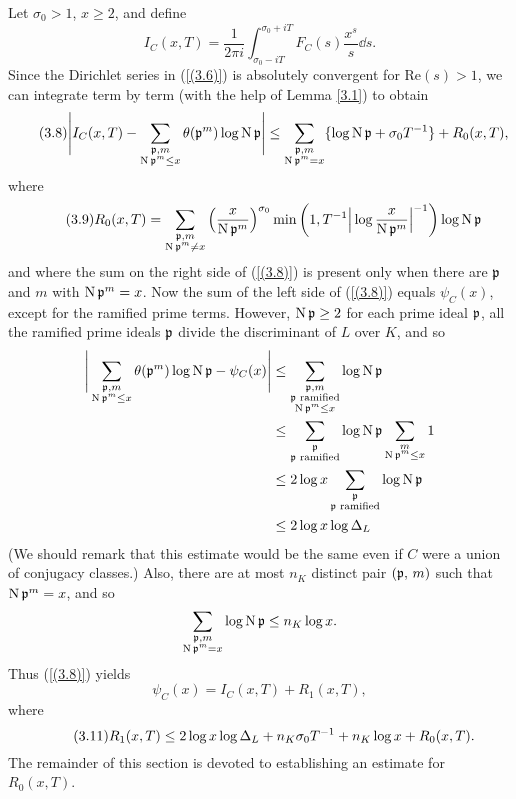 \documentclass[./main]{subfiles}
\begin{document}
Let $\sigma_0>1$, $x\ge 2$, and define
\[ \tag{3.7}\label{(3.7)}
I_C(x,T)= \frac{1}{2 \pi i} \int_{\sigma_0-iT}^{\sigma_0+iT} F_C(s)\frac{x^s}{s}\dd s.\]
Since the Dirichlet series in (\ref{(3.6)}) is absolutely convergent for $\text{Re}(s)>1$, we can integrate term by term (with the help of Lemma \ref{3.1}) to obtain
\[ \tag{3.8}\label{(3.8)}
\Bigg| I_C(x,T)-\sum_{\substack{\mathfrak{p}, m \\ \operatorname{N}\mathfrak{p}^m \le x}} \theta(\mathfrak{p}^m)\log \operatorname{N}\mathfrak{p} \Bigg| \le \sum_{\substack{\mathfrak{p}, m \\ \operatorname{N}\mathfrak{p}^m=x}}\{\log \operatorname{N}\mathfrak{p}+ \sigma_0T^{-1}\} +R_0(x,T),\]
where \[ \tag{3.9}\label{(3.9)}
R_0(x,T)=\sum_{\substack{\mathfrak{p}, m \\ \operatorname{N}\mathfrak{p}^m\neq x}}\Big( \frac{x}{\operatorname{N}\mathfrak{p}^m}\Big)^{\sigma_0} \min\bigg(1, T^{-1}\Big| \log \frac{x}{\operatorname{N}\mathfrak{p}^m}\Big|^{-1}\bigg) \log \operatorname{N} \mathfrak{p}\]
and where the sum on the right side of (\ref{(3.8)}) is present only when there are $\mathfrak{p}$ and $m$ with $\operatorname{N}\mathfrak{p}^m=x$. Now the sum of the left side of (\ref{(3.8)}) equals $\psi_C(x)$, except for the ramified prime terms. However, $\operatorname{N}\mathfrak{p} \ge 2$ for each prime ideal $\mathfrak{p}$, all the ramified prime ideals $\mathfrak{p}$ divide the discriminant of $L$ over $K$, and so 
\[\begin{aligned}
    \Bigg|\sum_{\substack{\mathfrak{p}, m \\ \operatorname{N}\mathfrak{p}^m \le x}} \theta(\mathfrak{p}^m)\log \operatorname{N}\mathfrak{p} -\psi_C(x)\Bigg| &\le \sum_{\substack{\mathfrak{p}, m \\ \mathfrak{p} \text{ ramified} \\ \operatorname{N}\mathfrak{p}^m \le x}} \log \operatorname{N}\mathfrak{p} 
    \\
    & \le \sum_{\substack{\mathfrak{p} \\ \mathfrak{p} \text{ ramified} }} \log \operatorname{N} \mathfrak{p} \sum_{\substack{m\\ \operatorname{N}\mathfrak{p}^m\le x}} 1 \\
    & \le 2 \log x \sum_{\substack{\mathfrak{p} \\ \mathfrak{p} \text{ ramified}}} \log \operatorname{N}\mathfrak{p} \\
    & \le 2 \log x \log \Delta_L
\end{aligned}\]
(We should remark that this estimate would be the same even if $C$ were a union of conjugacy classes.) Also, there are at most $n_K$ distinct pair $(\mathfrak{p}, \, m)$ such that $\operatorname{N}\mathfrak{p}^m=x$, and so
\[ \sum_{\substack{\mathfrak{p}, m \\ \operatorname{N}\mathfrak{p}^m=x}} \log \operatorname{N} \mathfrak{p} \le n_K\log x.\]
Thus (\ref{(3.8)}) yields
\[\tag{3.10} \label{(3.10)} \psi_C(x)=I_C(x,T)+R_1(x,T),\]
where
\[\tag{3.11} \label{(3.11)} R_1(x,T) \le 2 \log x \log \Delta_L+n_K\sigma_0T^{-1}+n_K \log x +R_0(x,T).\]
The remainder of this section is devoted to establishing an estimate for $R_0(x,T)$.
\end{document}
